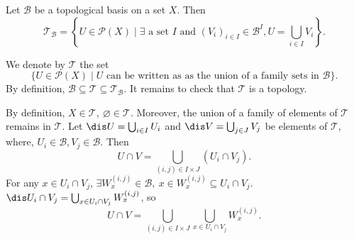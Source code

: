 \begin{propositionenv}
    Let $\mathcal{B}$ be a topological basis on a set $X$. Then
    $$\mathscr{T}_{\mathcal{B}}=\left\{U\in\mathscr{P}(X)\mid \exists \text{ a set }I \text{ and }(V_i)_{i\in I}\in \mathcal{B}^I, U=\bigcup_{i\in I}V_i\right\}.$$
\end{propositionenv}
\begin{proofenv}
    We denote by $\mathscr{T}$ the set 
    $$\{U\in \mathscr{P}(X)\mid U\text{ can be written as as the union of a family sets in }\mathcal{B}\}.$$
    By definition, $\mathcal{B}\subseteq\mathscr{T}\subseteq\mathscr{T}_{\mathcal{B}}$. It remains to check that $\mathscr{T}$ is a topology.

    By definition, $X\in \mathscr{T},\ \varnothing\in \mathscr{T}$. Moreover, the union of a family of elements of $\mathscr{T}$ remains in $\mathscr{T}$. Let $\dis U=\bigcup_{i\in I}U_i$ and $\dis V=\bigcup_{j\in J}V_j$ be elements of $\mathscr{T}$, where, $U_i\in\mathcal{B}, V_{j}\in \mathcal{B}$. Then 
    $$ U\cap V=\bigcup_{(i,j)\in I\times J}\left(U_i\cap V_{j}\right).$$
    For any $x\in U_i\cap V_j$, $\exists W_x^{(i,j)}\in \mathcal{B},\ x\in W_x^{(i,j)}\subseteq U_i\cap V_j$. $\dis U_i\cap V_j=\bigcup_{x\in U_i\cap V_j}W_x^{(i,j)}$, so 
    $$U\cap V=\bigcup_{(i,j)\in I\times J}\bigcup_{x\in U_i\cap V_j}W_x^{(i,j)}.$$
\end{proofenv}


